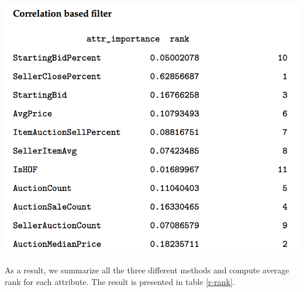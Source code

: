 \documentclass[CEJM,PDF]{cej} %
\begin{document}
\begin{center}
\includegraphics[scale=0.5]{correlation.png}\\
\end{center}
As a result, we summarize all the three different methods and compute average rank for each attribute. The result is presented in table \ref{r-rank}.
\end{document}
